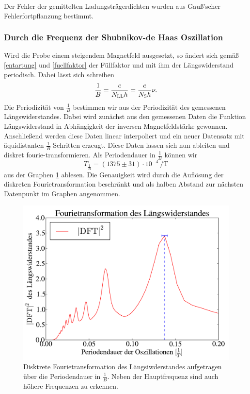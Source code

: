 \documentclass[paper=a4,fontsize=10pt,DIV=18,twocolumn,parskip=half]{scrartcl}
\numberwithin{equation}{section}    %
\begin{document}
Der Fehler der gemittelten Ladungsträgerdichten wurden aus Gauß'scher Fehlerfortpflanzung bestimmt.\\

\subsubsection*{Durch die Frequenz der Shubnikov-de Haas Oszillation}
Wird die Probe einem steigendem Magnetfeld ausgesetzt, so ändert sich gemäß \eqref{entartung} und \eqref{fuellfaktor} der Füllfaktor und mit ihm der Längswiderstand periodisch. Dabei lässt sich schreiben
\begin{equation}
\frac{1}{B}=\frac{e}{N_{\rm LL} h}=\frac{e}{N_\mathrm{S} h} \nu.
\end{equation}
Die Periodizität von $\frac{1}{B}$ bestimmen wir aus der Periodizität des gemessenen Längswiderstandes. Dabei wird zunächst aus den gemessenen Daten die Funktion Längswiderstand in Abhängigkeit der inversen Magnetfeldstärke gewonnen. Anschließend werden diese Daten linear interpoliert und ein neuer Datensatz mit äquidistanten $\frac{1}{B}$-Schritten erzeugt. Diese Daten lassen sich nun ableiten und diskret fourie-transformieren. Als Periodendauer in $\frac{1}{B}$ können wir
\begin{equation}
T_{\frac{1}{B}}=(1375\pm 31) \cdot 10^{-4}\SI{}{\per\tesla}
\label{periodizitaet}
\end{equation}
aus der Graphen \ref{fft} ablesen. Die Genauigkeit wird durch die Auflösung der diskreten Fourietransformation beschränkt und als halben Abstand zur nächsten Datenpunkt im Graphen angenommen.

\begin{figure}[]
	\begin{center}
		\includegraphics[width=\columnwidth]{Data-Plots/06-Fourietransformation.pdf}
		\caption{Disktrete Fourietransformation des Längsiwderstandes aufgetragen über die Periodendauer in $\frac{1}{B}$. Neben der Hauptfrequenz sind auch höhere Frequenzen zu erkennen.}
		\label{fft}
	\end{center}
\end{figure}
\end{document}
